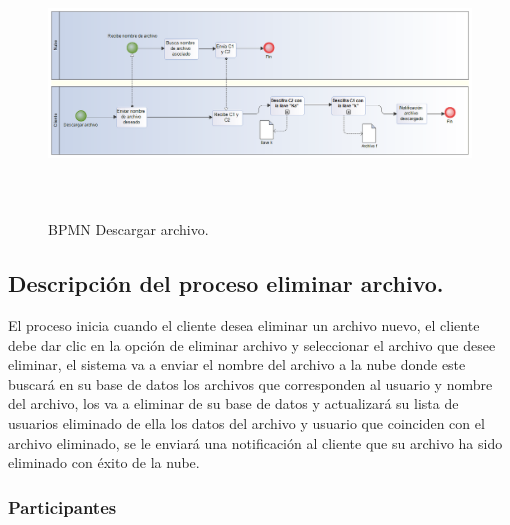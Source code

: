 \begin{figure}[H]
\centering
	\includegraphics[width=16cm, height=7cm]{./images/BPM_Descargar.png}
	\caption{BPMN Descargar archivo.}

\end{figure}

\vspace{3cm}
\subsection{Descripción del proceso eliminar archivo.}

El proceso inicia cuando el cliente desea eliminar un archivo nuevo, el cliente debe dar clic en la opción de eliminar archivo y seleccionar el archivo que desee eliminar, el sistema va a enviar el nombre del archivo a la nube donde este buscará en su base de datos los archivos que corresponden al usuario y nombre del archivo, los va a eliminar de su base de datos y actualizará su lista de usuarios eliminado de ella los datos del archivo y usuario que coinciden con el archivo eliminado, se le enviará una notificación al cliente que su archivo ha sido eliminado con éxito de la nube.\\



\subsubsection{Participantes}

